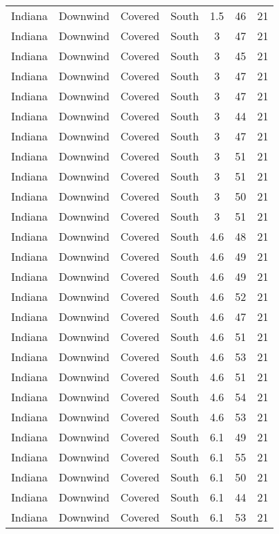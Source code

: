 \documentclass{article}
\begin{document}
\begin{longtable}[H]{ccccccc}
Indiana & Downwind & Covered     & South  & 1.5  & 46 & 21 \\
Indiana & Downwind & Covered     & South  & 3    & 47 & 21 \\
Indiana & Downwind & Covered     & South  & 3    & 45 & 21 \\
Indiana & Downwind & Covered     & South  & 3    & 47 & 21 \\
Indiana & Downwind & Covered     & South  & 3    & 47 & 21 \\
Indiana & Downwind & Covered     & South  & 3    & 44 & 21 \\
Indiana & Downwind & Covered     & South  & 3    & 47 & 21 \\
Indiana & Downwind & Covered     & South  & 3    & 51 & 21 \\
Indiana & Downwind & Covered     & South  & 3    & 51 & 21 \\
Indiana & Downwind & Covered     & South  & 3    & 50 & 21 \\
Indiana & Downwind & Covered     & South  & 3    & 51 & 21 \\
Indiana & Downwind & Covered     & South  & 4.6  & 48 & 21 \\
Indiana & Downwind & Covered     & South  & 4.6  & 49 & 21 \\
Indiana & Downwind & Covered     & South  & 4.6  & 49 & 21 \\
Indiana & Downwind & Covered     & South  & 4.6  & 52 & 21 \\
Indiana & Downwind & Covered     & South  & 4.6  & 47 & 21 \\
Indiana & Downwind & Covered     & South  & 4.6  & 51 & 21 \\
Indiana & Downwind & Covered     & South  & 4.6  & 53 & 21 \\
Indiana & Downwind & Covered     & South  & 4.6  & 51 & 21 \\
Indiana & Downwind & Covered     & South  & 4.6  & 54 & 21 \\
Indiana & Downwind & Covered     & South  & 4.6  & 53 & 21 \\
Indiana & Downwind & Covered     & South  & 6.1  & 49 & 21 \\
Indiana & Downwind & Covered     & South  & 6.1  & 55 & 21 \\
Indiana & Downwind & Covered     & South  & 6.1  & 50 & 21 \\
Indiana & Downwind & Covered     & South  & 6.1  & 44 & 21 \\
Indiana & Downwind & Covered     & South  & 6.1  & 53 & 21 \\

\end{longtable}
\end{document}
